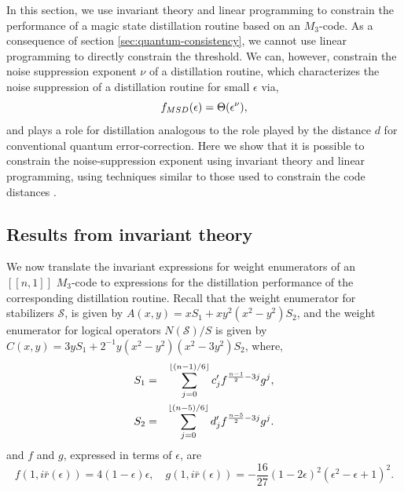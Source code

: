 \documentclass[11pt]{article}
\DeclarePairedDelimiter\floor{\lfloor}{\rfloor}
\begin{document}
In this section, we use invariant theory and linear programming to constrain the performance of a magic state distillation routine based on an $M_3$-code. As a consequence of section \ref{sec:quantum-consistency}, we cannot use linear programming to directly constrain the threshold. We can, however, constrain the noise suppression exponent $\nu$ of a distillation routine, which characterizes the noise suppression of a distillation routine for small $\epsilon$ via,
\begin{equation}
      f_{\rm MSD}(\epsilon) = \Theta(\epsilon^\nu),  
\end{equation} 
and plays a role for distillation analogous to the role played by the distance $d$ for conventional quantum error-correction. Here we show that it is possible to constrain the noise-suppression exponent using invariant theory and linear programming, using techniques similar to those used to constrain the code distances \cite{MALLOWS197568,rains,MALLOWS1973188,conway1990new}. 

\subsection{Results from invariant theory}


We now translate the invariant expressions for weight enumerators of an $[[n,1]]$ $M_3$-code to expressions for the distillation performance of the corresponding distillation routine. Recall that the weight enumerator for stabilizers $\mathcal S$, is given by $A(x,y)=xS_1+xy^2(x^2-y^2)S_2$, and the weight enumerator for logical operators $N(\mathcal S)/S$ is given by $C(x,y)= 3y S_1 +2^{-1} y (x^2 - y^2)(x^2 - 3 y^2) S_2$, where,\begin{eqnarray}
S_1 & = & \sum_{j=0}^{\floor{(n-1)/6}}c_j'  f^{\frac{n-1}{2}-3 j}  g^{j},\\ S_2  &=&  \sum_{j=0}^{\floor{(n-5)/6}} d_j'  f^{\frac{n-5}{2} -3j}  g^{j}.
\end{eqnarray}
and $f$ and $g$, expressed in terms of $\epsilon$, are
\begin{equation}
f(1,i\bar{r}(\epsilon)) = 4 (1-\epsilon) \epsilon, \quad g(1,i\bar{r}(\epsilon)) = -\frac{16}{27}  (1-2 \epsilon )^2 \left(\epsilon ^2-\epsilon +1\right)^2.
\end{equation}
\end{document}
